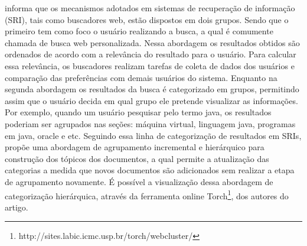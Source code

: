 \cite{Matsumoto10} informa que os mecanismos adotados em sistemas de recuperação de informação
(SRI), tais como buscadores web, estão dispostos em dois grupos. Sendo que o primeiro tem como foco
o usuário realizando a busca, a qual é comumente chamada de busca web personalizada.  Nessa
abordagem os resultados obtidos são ordenados de acordo com a relevância do resultado para o
usuário. Para calcular essa relevância, os buscadores realizam tarefas de coleta de dados dos
usuários e comparação das preferências com demais usuários do sistema.  Enquanto na segunda
abordagem os resultados da busca é categorizado em grupos, permitindo assim que o usuário decida em
qual grupo ele pretende visualizar as informações. Por exemplo, quando um usuário pesquisar pelo
termo java, os resultados poderiam ser agrupados nas seções: máquina virtual, linguagem java,
programas em java, oracle e etc. Seguindo essa linha de categorização de resultados em SRIs,
\cite{MarcaciniR10} propõe uma abordagem de agrupamento incremental e hierárquico para construção
dos tópicos dos documentos, a qual permite a atualização das categorias a medida que novos
documentos são adicionados sem realizar a etapa de agrupamento novamente. É possível a visualização
dessa abordagem de categorização hierárquica, através da ferramenta online
Torch\footnote{http://sites.labic.icmc.usp.br/torch/webcluster/}, dos autores do artigo.

